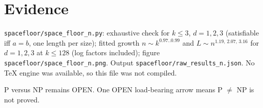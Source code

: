 \documentclass[11pt]{article}
\begin{document}
\section{Evidence}
\texttt{spacefloor/space\_floor\_n.py}: exhaustive check for $k\le3$, $d=1,2,3$ (satisfiable iff $a=b$, one length per size); fitted growth $n\sim k^{0.97..0.99}$ and $L\sim n^{1.19,\,2.07,\,3.16}$ for $d=1,2,3$ at $k\le128$ (log factors included); figure \texttt{spacefloor/space\_floor\_n.png}. Output \texttt{spacefloor/raw\_results\_n.json}. No TeX engine was available, so this file was not compiled.

\medskip\noindent P versus NP remains OPEN. One OPEN load-bearing arrow means P $\ne$ NP is not proved.
\end{document}
